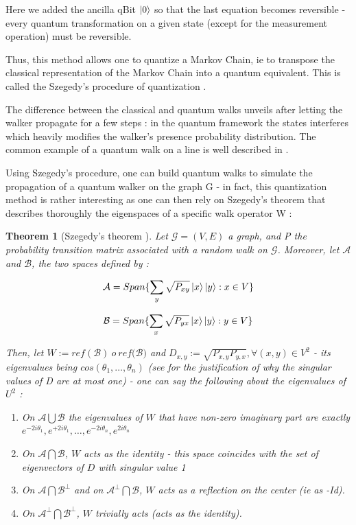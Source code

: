 \documentclass{article}
\newtheorem{theo}{Theorem}[section]
\begin{document}
Here we added the ancilla qBit $\ket{0}$ so that the last equation becomes reversible - every quantum transformation on a given state (except for the measurement operation) must be reversible.

Thus, this method allows one to quantize a Markov Chain, ie to transpose the classical representation of the Markov Chain into a quantum equivalent. This is called the Szegedy's procedure of quantization \cite{szegedy}.

The difference between the classical and quantum walks unveils after letting the walker propagate for a few steps : in the quantum framework the states interferes which heavily modifies the walker's presence probability distribution. The common example of a quantum walk on a line is well described in \cite{kempe_2009}.

Using Szegedy's procedure, one can build quantum walks to simulate the propagation of a quantum walker on the graph G - in fact, this quantization method is rather interesting as one can then rely on Szegedy's theorem that describes thoroughly the eigenspaces of a specific walk operator W :

\begin{theo}[Szegedy's theorem \cite{szegedy}]
Let $\mathcal{G}=(V,E)$ a graph, and P the probability transition matrix associated with a random walk on $\mathcal{G}$. Moreover, let $\mathcal{A}$ and $\mathcal{B}$, the two spaces defined by :

\begin{equation*}
    \mathcal{A} = Span\{\sum_y \sqrt{P_{xy}} \ket{x} \ket{y} : x \in V\}
\end{equation*}

\begin{equation*}
    \mathcal{B} = Span\{\sum_x \sqrt{P_{yx}} \ket{x} \ket{y} : y \in V\}
\end{equation*}

Then, let $W := ref(\mathcal{B})\ o \ ref(\mathcal{B)}$ and $D_{x,y} := \sqrt{P_{x,y}P_{y,x}}, \forall (x,y) \in V^2$ - its eigenvalues being $cos(\theta_1, \hdots, \theta_n)$ (see \cite{szegedy} for the justification of why the singular values of D are at most one) - one can say the following about the eigenvalues of $U^2$ : 

\begin{enumerate}
    \item On $\mathcal{A} \bigcup \mathcal{B}$ the eigenvalues of $W$ that have non-zero imaginary part are exactly $e^{-2i\theta_1}, e^{+2i\theta_1}, \hdots, e^{-2i\theta_n}, e^{2i\theta_n}$
    \item On $\mathcal{A} \bigcap \mathcal{B}$, $W$ acts as the identity - this space coincides with the set of eigenvectors of $D$ with singular value 1
    \item On $\mathcal{A} \bigcap \mathcal{B}^{\perp}$ and on $\mathcal{A}^{\perp} \bigcap \mathcal{B}$, $W$ acts as a reflection on the center (ie as -Id).
    \item On $\mathcal{A}^{\perp} \bigcap \mathcal{B}^{\perp}$, $W$ trivially acts (acts as the identity).
\end{enumerate}

\end{theo}
 
\end{document}
